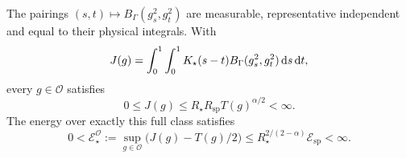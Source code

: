 \begin{proposition}
  \label{P:occupation-physical-class}
  The pairings $(s,t)\mapsto B_\Gamma(g_s^2,g_t^2)$ are measurable,
  representative independent and equal to their physical integrals. With
  \[
    J(g)=\int_0^1\int_0^1
    K_\star(s-t)B_\Gamma(g_s^2,g_t^2)\,\mathrm{d} s\,\mathrm{d} t,
  \]
  every $g \in \mathcal{O}$ satisfies
  \begin{equation}\label{E:occupation-physical-bound}
    0\le J(g)\le R_\star R_{\mathrm{sp}}T(g)^{\alpha/2}<\infty.
  \end{equation}
  The energy over exactly this full class satisfies
  \begin{equation}\label{E:occupation-own-energy}
    0<\mathcal{E}_\star^{\mathcal{O}}
    :=\sup_{g\in\mathcal{O}}\big(J(g)-T(g)/2\big)
    \le R_\star^{2/(2-\alpha)}\mathcal{E}_{\mathrm{sp}}<\infty.
  \end{equation}
\end{proposition}

